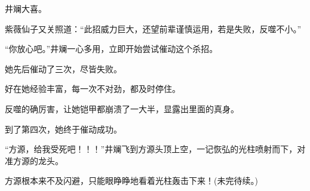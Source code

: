 \begin{this_body}
井斓大喜。

紫薇仙子又关照道：“此招威力巨大，还望前辈谨慎运用，若是失败，反噬不小。”

“你放心吧。”井斓一心多用，立即开始尝试催动这个杀招。

她先后催动了三次，尽皆失败。

好在她经验丰富，每一次不对劲，都及时停住。

反噬的确厉害，让她铠甲都崩溃了一大半，显露出里面的真身。

到了第四次，她终于催动成功。

“方源，给我受死吧！！！”井斓飞到方源头顶上空，一记恢弘的光柱喷射而下，对准方源的龙头。

方源根本来不及闪避，只能眼睁睁地看着光柱轰击下来！(未完待续。)

\end{this_body}

